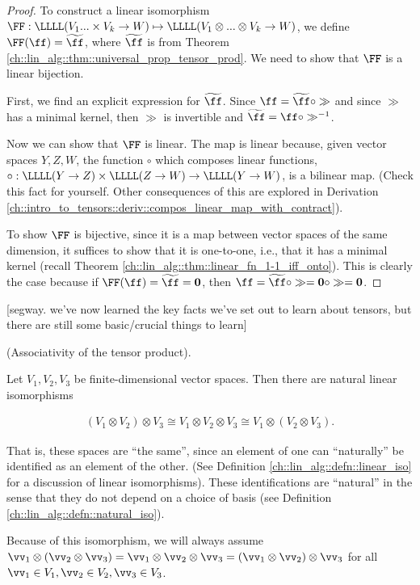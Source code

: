 \begin{proof}
    To construct a linear isomorphism $\FF:\LLLL(V_1 ... \times V_k \rightarrow W) \mapsto \LLLL(V_1 \otimes ... \otimes V_k \rightarrow W)$, we define $\FF(\ff) = \widetilde{\ff}$, where $\widetilde{\ff}$ is from Theorem \ref{ch::lin_alg::thm::universal_prop_tensor_prod}. We need to show that $\FF$ is a linear bijection. 
    
    First, we find an explicit expression for $\widetilde{\ff}$. Since $\ff = \widetilde{\ff} \circ \gg$ and since $\gg$ has a minimal kernel, then $\gg$ is invertible and $\widetilde{\ff} = \ff \circ \gg^{-1}$.

    Now we can show that $\FF$ is linear. The map is linear because, given vector spaces $Y, Z, W$, the function $\circ$ which composes linear functions, ${\circ:\LLLL(Y \rightarrow Z) \times \LLLL(Z \rightarrow W) \rightarrow \LLLL(Y \rightarrow W)}$, is a bilinear map. (Check this fact for yourself. Other consequences of this are explored in Derivation \ref{ch::intro_to_tensors::deriv::compos_linear_map_with_contract}). 
    
    To show $\FF$ is bijective, since it is a map between vector spaces of the same dimension, it suffices to show that it is one-to-one, i.e., that it has a minimal kernel (recall Theorem \ref{ch::lin_alg::thm::linear_fn_1-1_iff_onto}). This is clearly the case because if $\FF(\ff) = \widetilde{\ff} = \mathbf{0}$, then $\ff = \widetilde{\ff} \circ \gg = \mathbf{0} \circ \gg = \mathbf{0}$.
\end{proof}

[segway. we've now learned the key facts we've set out to learn about tensors, but there are still some basic/crucial things to learn]

\begin{theorem}    \label{ch::motivated_intro::thm::tensor_product_associative}
    (Associativity of the tensor product). 
    
    Let $V_1, V_2, V_3$ be finite-dimensional vector spaces. Then there are natural linear isomorphisms
    
    \begin{align*}
        (V_1 \otimes V_2) \otimes V_3 \cong V_1 \otimes V_2 \otimes V_3 \cong V_1 \otimes (V_2 \otimes V_3).
    \end{align*}
    
    That is, these spaces are ``the same'', since an element of one can ``naturally'' be identified as an element of the other. (See Definition \ref{ch::lin_alg::defn::linear_iso} for a discussion of linear isomorphisms). These identifications are ``natural'' in the sense that they do not depend on a choice of basis (see Definition \ref{ch::lin_alg::defn::natural_iso}).

    Because of this isomorphism, we will always assume $\vv_1 \otimes (\vv_2 \otimes \vv_3) = \vv_1 \otimes \vv_2 \otimes \vv_3 = (\vv_1 \otimes \vv_2) \otimes \vv_3$ for all $\vv_1 \in V_1, \vv_2 \in V_2, \vv_3 \in V_3$.
\end{theorem}

